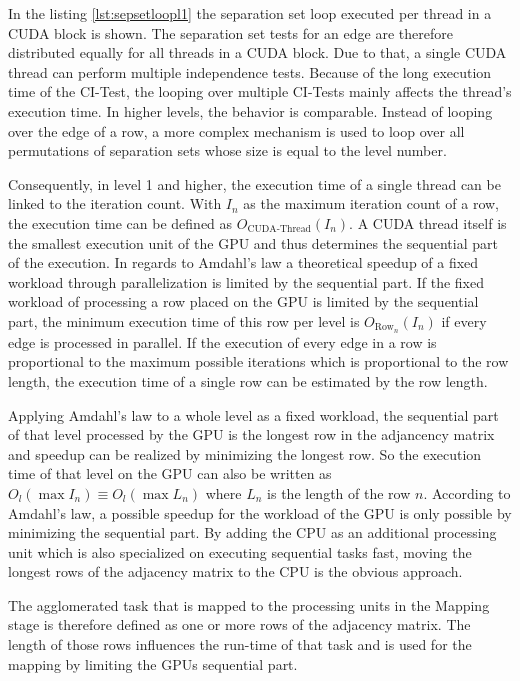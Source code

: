 In the listing \ref{lst:sepsetloopl1} the separation set loop executed per thread in a CUDA block is shown. The separation set tests for an edge are therefore distributed equally for all threads in a CUDA block. Due to that, a single CUDA thread can perform multiple independence tests. Because of the long execution time of the CI-Test, the looping over multiple CI-Tests mainly affects the thread's execution time. In higher levels, the behavior is comparable. Instead of looping over the edge of a row, a more complex mechanism is used to loop over all permutations of separation sets whose size is equal to the level number.

Consequently, in level 1 and higher, the execution time of a single thread can be linked to the iteration count. With $I_n$ as the maximum iteration count of a row, the execution time can be defined as $O_{\text{CUDA-Thread}}(I_n)$. A CUDA thread itself is the smallest execution unit of the GPU and thus determines the sequential part of the execution. In regards to Amdahl's law \cite{amdahlValiditySingleProcessor1967} a theoretical speedup of a fixed workload through parallelization is limited by the sequential part. If the fixed workload of processing a row placed on the GPU is limited by the sequential part, the minimum execution time of this row per level is $O_{\text{Row}_n}(I_n)$ if every edge is processed in parallel. If the execution of every edge in a row is proportional to the maximum possible iterations which is proportional to the row length, the execution time of a single row can be estimated by the row length.

Applying Amdahl's law to a whole level as a fixed workload, the sequential part of that level processed by the GPU is the longest row in the adjancency matrix and speedup can be realized by minimizing the longest row. So the execution time of that level on the GPU can also be written as $O_{l}(\max I_n) \equiv O_{l}(\max L_n)$ where $L_n$ is the length of the row $n$. According to Amdahl's law, a possible speedup for the workload of the GPU is only possible by minimizing the sequential part. By adding the CPU as an additional processing unit which is also specialized on executing sequential tasks fast, moving the longest rows of the adjacency matrix to the CPU is the obvious approach.

The agglomerated task that is mapped to the processing units in the Mapping stage is therefore defined as one or more rows of the adjacency matrix. The length of those rows influences the run-time of that task and is used for the mapping by limiting the GPUs sequential part.

